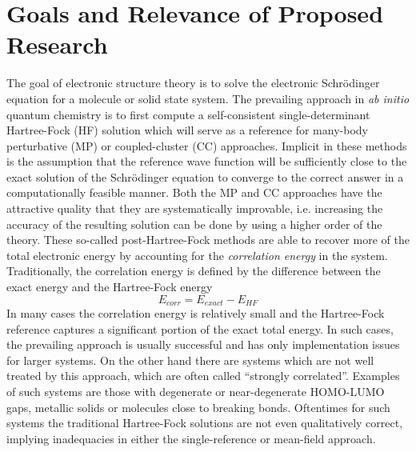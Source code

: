 \documentclass{revtex4}
\begin{document}
    
\newpage
\section{Goals and Relevance of Proposed Research}
    The goal of electronic structure theory is to solve the electronic Schr{\"o}dinger equation
    for a molecule or solid state system. The prevailing approach in \emph{ab initio} quantum 
    chemistry is to first compute a self-consistent single-determinant Hartree-Fock (HF) solution 
    which will serve as a reference for many-body perturbative (MP) or coupled-cluster (CC) 
    approaches.  
    Implicit in these methods is the assumption that the reference wave function will be 
    sufficiently close to the exact solution of the Schr{\"o}dinger equation to converge to the 
    correct 
    answer in a computationally feasible manner. Both the MP and CC approaches have the attractive 
    quality that they are systematically improvable, i.e. increasing the accuracy of the resulting 
    solution can be done by using a higher order of the theory. These so-called post-Hartree-Fock 
    methods are able to recover more of the total electronic energy by accounting for the 
    \emph{correlation energy} in the system. Traditionally, the correlation energy is defined by 
    the difference between the exact energy and the Hartree-Fock energy \cite{Shavitt2009}
    \begin{equation}\label{correlation_energy}
      E_{corr} = E_{exact} -  E_{HF}
    \end{equation}
    In many cases the correlation energy is relatively small and the Hartree-Fock reference 
    captures a significant portion of the exact total energy. In such cases, the prevailing 
    approach is usually successful and has only implementation issues for larger systems. On the 
    other hand there are systems which are not well treated by this approach, which are often 
    called ``strongly correlated''. Examples of such systems are those with degenerate or 
    near-degenerate HOMO-LUMO gaps, metallic solids or molecules close to breaking bonds. 
    Oftentimes for such systems the traditional Hartree-Fock solutions are not even qualitatively 
    correct, implying inadequacies in either the single-reference or mean-field approach. 
      
\end{document}
